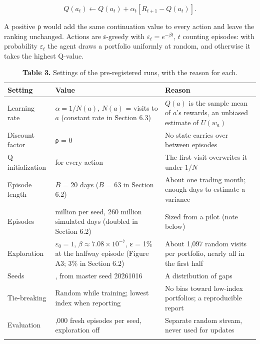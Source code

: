 \documentclass[
  11pt]{article}
\begin{document}
\[Q(a_t) \leftarrow Q(a_t) + \alpha_t \left[ R_{t+1} - Q(a_t) \right].\]

A positive ρ would add the same continuation value to every action and
leave the ranking unchanged. Actions are ε-greedy with
\(\varepsilon_t = e^{-\beta t}\), \(t\) counting episodes: with
probability \(\varepsilon_t\) the agent draws a portfolio uniformly at
random, and otherwise it takes the highest Q-value.

\begin{table}[htbp]
\centering\small
\caption{\textbf{Table 3.} Settings of the pre-registered runs, with the
reason for each.}
\begin{tabular}{@{}
  >{\raggedright\arraybackslash}p{}
  >{\raggedright\arraybackslash}p{}
  >{\raggedright\arraybackslash}p{}@{}}
\toprule\noalign{}
\begin{minipage}[b]{\linewidth}\raggedright
Setting
\end{minipage} & \begin{minipage}[b]{\linewidth}\raggedright
Value
\end{minipage} & \begin{minipage}[b]{\linewidth}\raggedright
Reason
\end{minipage} \\
\midrule\noalign{}
Learning rate & \(\alpha = 1/N(a)\), \(N(a)\) = visits to \(a\)
(constant rate in Section 6.3) & \(Q(a)\) is the sample mean of \(a\)'s
rewards, an unbiased estimate of \(U(w_a)\) \\
Discount factor & ρ = 0 & No state carries over between episodes \\
Q initialization & 0 for every action & The first visit overwrites it
under \(1/N\) \\
Episode length & \(B\) = 20 days (\(B\) = 63 in Section 6.2) & About one
trading month; enough days to estimate a variance \\
Episodes & 13 million per seed, 260 million simulated days (doubled in
Section 6.2) & Sized from a pilot (note below) \\
Exploration & \(\varepsilon_0 = 1\),
\(\beta \approx 7.08 \times 10^{-7}\), ε = 1\% at the halfway episode
(Figure A3; 3\% in Section 6.2) & About 1,097 random visits per
portfolio, nearly all in the first half \\
Seeds & 10, from master seed 20261016 & A distribution of gaps \\
Tie-breaking & Random while training; lowest index when reporting & No
bias toward low-index portfolios; a reproducible report \\
Evaluation & 10,000 fresh episodes per seed, exploration off & Separate
random stream, never used for updates \\
\bottomrule\noalign{}
\end{tabular}
\end{table}
\end{document}
